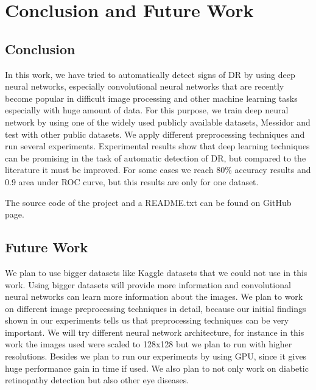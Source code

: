 \chapter{Conclusion and Future Work}
\label{conclusion}
\section{Conclusion}
In this work, we have tried to automatically detect signs of DR by using deep neural networks, especially convolutional neural networks that are recently become popular in difficult image processing and other machine learning tasks especially with huge amount of data. For this purpose, we train deep neural network by using one of the widely used publicly available datasets, Messidor and test with other public datasets. We apply different preprocessing techniques and run several experiments. Experimental results show that deep learning techniques can be promising in the task of automatic detection of DR, but compared to the literature it must be improved. For some cases we reach 80\% accuracy results and 0.9 area under ROC curve, but this results are only for one dataset.  

The source code of the project and a README.txt can be found on \citet{GitHub} GitHub page. 

\section{Future Work}
We plan to use bigger datasets like Kaggle datasets that we could not use in this work. Using bigger datasets will provide more information and convolutional neural networks can learn more information about the images. We plan to work on different image preprocessing techniques in detail, because our initial findings shown in our experiments tells us that preprocessing techniques can be very important. We will try different neural network architecture, for instance in this work the images used were scaled to 128x128 but we plan to run with higher resolutions. Besides we plan to run our experiments by using GPU, since it gives huge performance gain in time if used. We also plan to not only work on diabetic retinopathy detection but also other eye diseases. 